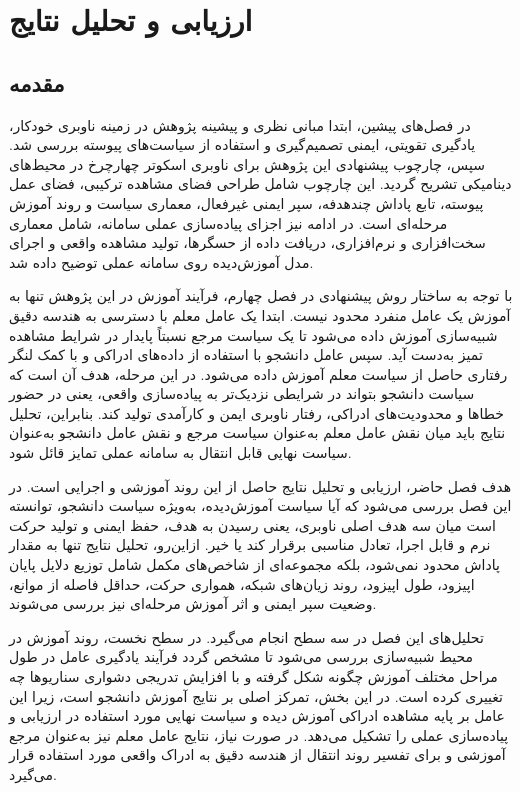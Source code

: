 \chapter{ارزیابی و تحلیل نتایج}

\section{مقدمه}
\label{sec:evaluation_intro}

در فصل‌های پیشین، ابتدا مبانی نظری و پیشینه پژوهش در زمینه ناوبری خودکار، یادگیری تقویتی، ایمنی تصمیم‌گیری و استفاده از سیاست‌های پیوسته بررسی شد. سپس، چارچوب پیشنهادی این پژوهش برای ناوبری اسکوتر چهارچرخ در محیط‌های دینامیکی تشریح گردید. این چارچوب شامل طراحی فضای مشاهده ترکیبی، فضای عمل پیوسته، تابع پاداش چندهدفه، سپر ایمنی غیرفعال، معماری سیاست  و روند آموزش مرحله‌ای است. در ادامه نیز اجزای پیاده‌سازی عملی سامانه، شامل معماری سخت‌افزاری و نرم‌افزاری، دریافت داده از حسگرها، تولید مشاهده واقعی و اجرای مدل آموزش‌دیده روی سامانه عملی توضیح داده شد.

با توجه به ساختار روش پیشنهادی در فصل چهارم، فرآیند آموزش در این پژوهش تنها به آموزش یک عامل منفرد محدود نیست. ابتدا یک عامل معلم با دسترسی به هندسه دقیق شبیه‌سازی آموزش داده می‌شود تا یک سیاست مرجع نسبتاً پایدار در شرایط مشاهده تمیز به‌دست آید. سپس عامل دانشجو با استفاده از داده‌های ادراکی و با کمک لنگر رفتاری حاصل از سیاست معلم آموزش داده می‌شود. در این مرحله، هدف آن است که سیاست دانشجو بتواند در شرایطی نزدیک‌تر به پیاده‌سازی واقعی، یعنی در حضور خطاها و محدودیت‌های ادراکی، رفتار ناوبری ایمن و کارآمدی تولید کند. بنابراین، تحلیل نتایج باید میان نقش عامل معلم به‌عنوان سیاست مرجع و نقش عامل دانشجو به‌عنوان سیاست نهایی قابل انتقال به سامانه عملی تمایز قائل شود.

هدف فصل حاضر، ارزیابی و تحلیل نتایج حاصل از این روند آموزشی و اجرایی است. در این فصل بررسی می‌شود که آیا سیاست آموزش‌دیده، به‌ویژه سیاست دانشجو، توانسته است میان سه هدف اصلی ناوبری، یعنی رسیدن به هدف، حفظ ایمنی و تولید حرکت نرم و قابل اجرا، تعادل مناسبی برقرار کند یا خیر. ازاین‌رو، تحلیل نتایج تنها به مقدار پاداش محدود نمی‌شود، بلکه مجموعه‌ای از شاخص‌های مکمل شامل توزیع دلایل پایان اپیزود، طول اپیزود، روند زیان‌های شبکه، همواری حرکت، حداقل فاصله از موانع، وضعیت سپر ایمنی و اثر آموزش مرحله‌ای نیز بررسی می‌شوند.

تحلیل‌های این فصل در سه سطح انجام می‌گیرد. در سطح نخست، روند آموزش در محیط شبیه‌سازی بررسی می‌شود تا مشخص گردد فرآیند یادگیری عامل در طول مراحل مختلف آموزش چگونه شکل گرفته و با افزایش تدریجی دشواری سناریوها چه تغییری کرده است. در این بخش، تمرکز اصلی بر نتایج آموزش دانشجو است، زیرا این عامل بر پایه مشاهده ادراکی آموزش دیده و سیاست نهایی مورد استفاده در ارزیابی و پیاده‌سازی عملی را تشکیل می‌دهد. در صورت نیاز، نتایج عامل معلم نیز به‌عنوان مرجع آموزشی و برای تفسیر روند انتقال از هندسه دقیق به ادراک واقعی مورد استفاده قرار می‌گیرد.

